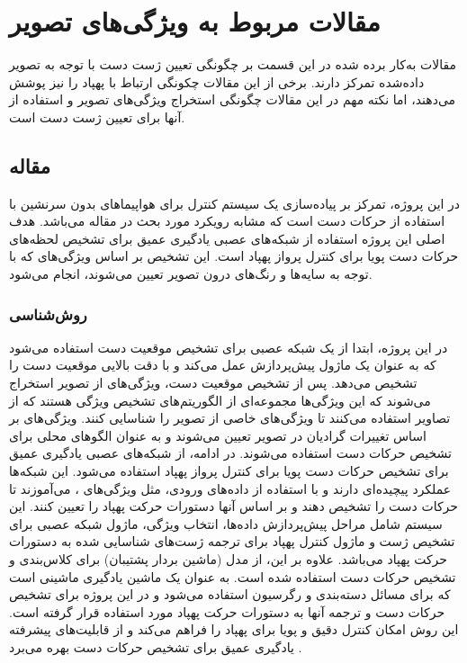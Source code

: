 \section{مقالات مربوط به ویژگی‌های تصویر}
مقالات به‌کار برده شده در این قسمت بر چگونگی تعیین ژست دست با توجه به تصویر داده‌شده تمرکز دارند. برخی از این مقالات چکونگی ارتباط با پهپاد را نیز پوشش می‌دهند، اما نکته مهم در این مقالات چگونگی استخراج ویژگی‌های تصویر و استفاده از آنها برای تعیین ژست دست است.


\subsection{مقاله }
در این پروژه، تمرکز بر پیاده‌سازی یک سیستم کنترل برای هواپیماهای بدون سرنشین با استفاده از حرکات دست است که مشابه رویکرد مورد بحث در مقاله می‌باشد.
هدف اصلی این پروژه استفاده از شبکه‌های عصبی یادگیری عمیق برای تشخیص لحظه‌های حرکات دست پویا برای کنترل پرواز پهپاد 
است. این تشخیص بر اساس ویژگی‌های  که با توجه به سایه‌ها و رنگ‌های درون تصویر تعیین می‌شوند، انجام می‌شود.

\subsubsection{روش‌شناسی}
در این پروژه، ابتدا از یک شبکه عصبی برای تشخیص موقعیت دست استفاده می‌شود که به عنوان یک ماژول پیش‌پردازش عمل می‌کند و با دقت بالایی موقعیت دست را تشخیص می‌دهد. پس از تشخیص 
موقعیت دست، ویژگی‌های  از تصویر استخراج می‌شوند که این ویژگی‌ها مجموعه‌ای از الگوریتم‌های تشخیص ویژگی هستند که از تصاویر استفاده می‌کنند تا ویژگی‌های خاصی از تصویر را 
شناسایی کنند. ویژگی‌های  بر اساس تغییرات گرادیان در تصویر تعیین می‌شوند و به عنوان الگوهای محلی برای تشخیص حرکات دست استفاده می‌شوند. در ادامه، از شبکه‌های عصبی یادگیری 
عمیق برای تشخیص حرکات دست پویا برای کنترل پرواز پهپاد استفاده می‌شود. این شبکه‌ها عملکرد پیچیده‌ای دارند و با استفاده از داده‌های ورودی، مثل ویژگی‌های ، می‌آموزند تا حرکات دست را 
تشخیص دهند و بر اساس آنها دستورات حرکت پهپاد را تعیین کنند. این سیستم شامل مراحل پیش‌پردازش داده‌ها، انتخاب ویژگی، ماژول شبکه عصبی برای تشخیص ژست و ماژول کنترل پهپاد برای ترجمه 
ژست‌های شناسایی شده به دستورات حرکت پهپاد می‌باشد. علاوه بر این، از مدل  (ماشین بردار پشتیبان) برای کلاس‌بندی و تشخیص حرکات دست استفاده شده است.  به عنوان یک ماشین یادگیری 
ماشینی است که برای مسائل دسته‌بندی و رگرسیون استفاده می‌شود و در این پروژه برای تشخیص حرکات دست و ترجمه آنها به دستورات حرکت پهپاد مورد استفاده قرار گرفته است. این روش امکان 
کنترل دقیق و پویا برای پهپاد را فراهم می‌کند و از قابلیت‌های پیشرفته یادگیری عمیق برای تشخیص حرکات دست بهره می‌برد .

